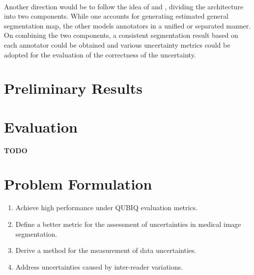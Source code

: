 \documentclass[12pt]{extarticle}
\begin{document}
\paragraph{}
Another direction would be to follow the idea of \cite{zhang2020disentangling} and \cite{kohl2019probabilistic}, 
dividing the architecture into two components. 
While one accounts for generating estimated general segmentation map,
the other models annotators in a unified or separated manner. On combining the two components, a consistent segmentation
result based on each annotator could be obtained and various uncertainty metrics could be adopted for
the evaluation of the correctness of the uncertainty.
\section{Preliminary Results}
\section{Evaluation}
\textbf{TODO}

\section{Problem Formulation}
\begin{enumerate}
    \item Achieve high performance under QUBIQ evaluation metrics.
    \item Define a better metric for the assessment of uncertainties in medical image segmentation.
    \item Derive a method for the measurement of data uncertainties.
    \item Address uncertainties caused by inter-reader variations.
\end{enumerate}



\end{document}
